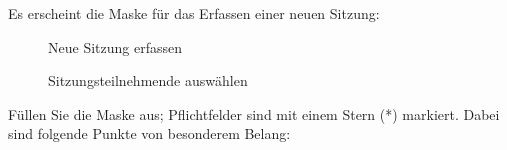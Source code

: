 \pagebreak

Es erscheint die Maske für das Erfassen einer neuen Sitzung:

\begin{figure}[H]
\caption{Neue Sitzung erfassen}
\end{figure}

\begin{figure}[H]
\caption{Sitzungsteilnehmende auswählen}
\end{figure}

Füllen Sie die Maske aus; Pflichtfelder sind mit einem Stern (*) markiert. Dabei sind folgende Punkte von besonderem Belang:

